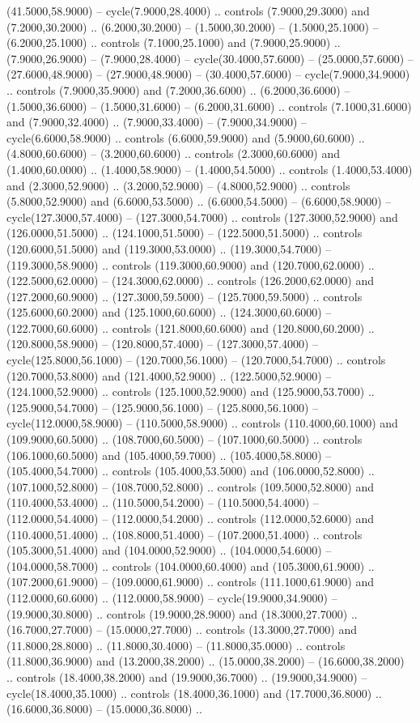 (41.5000,58.9000) -- cycle(7.9000,28.4000) .. controls (7.9000,29.3000) and (7.2000,30.2000) .. (6.2000,30.2000) -- (1.5000,30.2000) -- (1.5000,25.1000) -- (6.2000,25.1000) .. controls (7.1000,25.1000) and (7.9000,25.9000) .. (7.9000,26.9000) -- (7.9000,28.4000) -- cycle(30.4000,57.6000) -- (25.0000,57.6000) -- (27.6000,48.9000) -- (27.9000,48.9000) -- (30.4000,57.6000) -- cycle(7.9000,34.9000) .. controls (7.9000,35.9000) and (7.2000,36.6000) .. (6.2000,36.6000) -- (1.5000,36.6000) -- (1.5000,31.6000) -- (6.2000,31.6000) .. controls (7.1000,31.6000) and (7.9000,32.4000) .. (7.9000,33.4000) -- (7.9000,34.9000) -- cycle(6.6000,58.9000) .. controls (6.6000,59.9000) and (5.9000,60.6000) .. (4.8000,60.6000) -- (3.2000,60.6000) .. controls (2.3000,60.6000) and (1.4000,60.0000) .. (1.4000,58.9000) -- (1.4000,54.5000) .. controls (1.4000,53.4000) and (2.3000,52.9000) .. (3.2000,52.9000) -- (4.8000,52.9000) .. controls (5.8000,52.9000) and (6.6000,53.5000) .. (6.6000,54.5000) -- (6.6000,58.9000) -- cycle(127.3000,57.4000) -- (127.3000,54.7000) .. controls (127.3000,52.9000) and (126.0000,51.5000) .. (124.1000,51.5000) -- (122.5000,51.5000) .. controls (120.6000,51.5000) and (119.3000,53.0000) .. (119.3000,54.7000) -- (119.3000,58.9000) .. controls (119.3000,60.9000) and (120.7000,62.0000) .. (122.5000,62.0000) -- (124.3000,62.0000) .. controls (126.2000,62.0000) and (127.2000,60.9000) .. (127.3000,59.5000) -- (125.7000,59.5000) .. controls (125.6000,60.2000) and (125.1000,60.6000) .. (124.3000,60.6000) -- (122.7000,60.6000) .. controls (121.8000,60.6000) and (120.8000,60.2000) .. (120.8000,58.9000) -- (120.8000,57.4000) -- (127.3000,57.4000) -- cycle(125.8000,56.1000) -- (120.7000,56.1000) -- (120.7000,54.7000) .. controls (120.7000,53.8000) and (121.4000,52.9000) .. (122.5000,52.9000) -- (124.1000,52.9000) .. controls (125.1000,52.9000) and (125.9000,53.7000) .. (125.9000,54.7000) -- (125.9000,56.1000) -- (125.8000,56.1000) -- cycle(112.0000,58.9000) -- (110.5000,58.9000) .. controls (110.4000,60.1000) and (109.9000,60.5000) .. (108.7000,60.5000) -- (107.1000,60.5000) .. controls (106.1000,60.5000) and (105.4000,59.7000) .. (105.4000,58.8000) -- (105.4000,54.7000) .. controls (105.4000,53.5000) and (106.0000,52.8000) .. (107.1000,52.8000) -- (108.7000,52.8000) .. controls (109.5000,52.8000) and (110.4000,53.4000) .. (110.5000,54.2000) -- (110.5000,54.4000) -- (112.0000,54.4000) -- (112.0000,54.2000) .. controls (112.0000,52.6000) and (110.4000,51.4000) .. (108.8000,51.4000) -- (107.2000,51.4000) .. controls (105.3000,51.4000) and (104.0000,52.9000) .. (104.0000,54.6000) -- (104.0000,58.7000) .. controls (104.0000,60.4000) and (105.3000,61.9000) .. (107.2000,61.9000) -- (109.0000,61.9000) .. controls (111.1000,61.9000) and (112.0000,60.6000) .. (112.0000,58.9000) -- cycle(19.9000,34.9000) -- (19.9000,30.8000) .. controls (19.9000,28.9000) and (18.3000,27.7000) .. (16.7000,27.7000) -- (15.0000,27.7000) .. controls (13.3000,27.7000) and (11.8000,28.8000) .. (11.8000,30.4000) -- (11.8000,35.0000) .. controls (11.8000,36.9000) and (13.2000,38.2000) .. (15.0000,38.2000) -- (16.6000,38.2000) .. controls (18.4000,38.2000) and (19.9000,36.7000) .. (19.9000,34.9000) -- cycle(18.4000,35.1000) .. controls (18.4000,36.1000) and (17.7000,36.8000) .. (16.6000,36.8000) -- (15.0000,36.8000) .. 